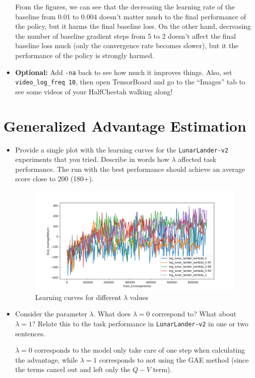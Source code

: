 \documentclass{article}
\begin{document}
\begin{itemize}
From the figures, we can see that the decreasing the learning rate of the baseline from 0.01 to 0.004 doesn't matter much to the final performance of the policy, but it harms the final baseline loss. On the other hand, decreasing the number of baseline gradient steps from 5 to 2 doesn't affect the final baseline loss much (only the convergence rate becomes slower), but it the performance of the policy is strongly harmed.

        \item \textbf{Optional:} Add \verb|-na| back to see how much it improves things. Also, set \verb|video_log_freq 10|, then open TensorBoard and go to the ``Images'' tab to see some videos of your HalfCheetah walking along!
\end{itemize}

\newpage\section{Generalized Advantage Estimation}
\begin{itemize}
        \item Provide a single plot with the learning curves for the \verb|LunarLander-v2| experiments that you tried. Describe in words how $\lambda$ affected task performance. The run with the best performance should achieve an average score close to 200 (180+).

\MYSOLUTION

\begin{figure}[H]
        \centering
        \includegraphics[width=0.9\linewidth]{./report/assets/E3_all.png} %
        \caption{Learning curves for different $\lambda$ values}
        \label{fig:E3}
\end{figure}
        \item Consider the parameter $\lambda$. What does $\lambda = 0$ correspond to? What about $\lambda = 1$? Relate this to the task performance in \verb|LunarLander-v2| in one or two sentences.
        
\MYSOLUTION

$\lambda=0$ corresponds to the model only take care of one step when calculating the advantage, while $\lambda=1$ corresponds to not using the GAE method (since the terms cancel out and left only the $Q-V$ term).

\end{itemize}
\end{document}
